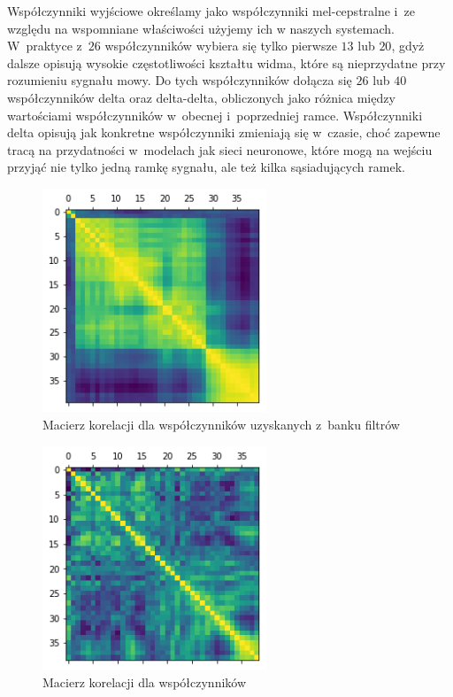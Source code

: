Współczynniki wyjściowe  określamy jako współczynniki mel-cepstralne i~ze względu na
wspomniane właściwości użyjemy ich
w naszych systemach. W~praktyce z~$26$ współczynników wybiera się tylko pierwsze $13$ lub $20$, gdyż dalsze opisują
wysokie częstotliwości kształtu widma, które są nieprzydatne przy rozumieniu sygnału mowy.
Do tych współczynników dołącza się $26$ lub $40$
współczynników delta oraz delta-delta, obliczonych jako różnica między wartościami współczynników w~obecnej i~poprzedniej
ramce. Współczynniki delta opisują jak konkretne współczynniki zmieniają się w~czasie,
choć zapewne tracą na przydatności w~modelach jak sieci neuronowe, które mogą na wejściu przyjąć nie tylko jedną ramkę sygnału,
ale też kilka sąsiadujących ramek.

\begin{figure}[H]
    \centering
    \includegraphics[width=0.6\textwidth]{images/2_1_f_correlation_matrix_banks}
    \caption{Macierz korelacji dla współczynników uzyskanych z~banku filtrów}
    \label{fig:2_1_f_correlation_matrix_banks}
\end{figure}

\begin{figure}[H]
    \centering
    \includegraphics[width=0.6\textwidth]{images/2_1_g_correlation_matrix_mfcc}
    \caption{Macierz korelacji dla współczynników }
    \label{fig:2_1_g_correlation_matrix_mfcc}
\end{figure}

